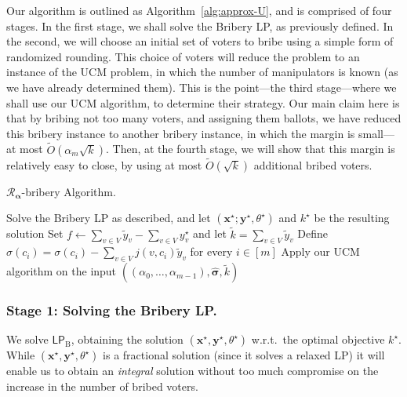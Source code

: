 \documentclass[letterpaper]{article} %
\theoremstyle{definition}
\newcommand\vecc{\mathbf}
\newcommand\vecgreek{\bm}
\newcommand{\veca}{\vecgreek{\alpha}}
\newcommand{\Ra}{\mathcal{R}_{\veca}}
\newcommand{\LPB}{\mathsf{LP}_{\mathrm{B}}}
\begin{document}
Our algorithm is outlined as Algorithm~\ref{alg:approx-U}, and is comprised of four stages. In the first stage, we shall solve the Bribery LP, as previously defined. In the second, we will choose an initial set of voters to bribe using a simple form of randomized rounding.
This choice of voters will reduce the problem to an instance of the UCM problem, in which the number of manipulators is known (as we have already determined them). This is the point---the third stage---where we shall use our UCM algorithm, to determine their strategy. Our main claim here is that by bribing not too many voters, and assigning them ballots, we have reduced this bribery instance to another bribery instance, in which the margin is small---at most $\widetilde{O}(\alpha_{m}\sqrt{k})$. Then, at the fourth stage, we will show that this margin is relatively easy to close, by using at most $\widetilde{O}(\sqrt{k})$ additional bribed voters.
\begin{algorithm}[t]
	\caption{$\Ra$-bribery Algorithm.}
	\label{alg:approx-U}
	Solve the Bribery LP as described, and let $(\vecc{x^\star };\vecc{y^\star },\theta^\star )$ and $k^\star$ be the resulting solution\;
	Set $f \gets \sum_{v \in V}\tilde{y}_v - \sum_{v \in V} y^\star _v$ and let $\tilde{k}=\sum_{v \in V} \tilde{y}_v$\;
	Define  $\hat{\sigma}(c_i)= \sigma(c_i) - \sum_{v \in V}j(v,c_i) \tilde{y}_{v}$ for every $i \in [m]$\;
	Apply our UCM algorithm on the input $((\alpha_{0},\ldots,\alpha_{m-1}),\vecgreek{\hat{\sigma}}, \tilde{k})$ \;
\end{algorithm}


\subsubsection{Stage 1: Solving the Bribery LP.}
We solve $\LPB$, obtaining the solution $(\vecc{x^\star },\vecc{y^\star },\theta^\star )$ w.r.t.\ the optimal objective $k^\star $. While $(\vecc{x^\star },\vecc{y^\star },\theta^\star )$ is a fractional solution (since it solves a relaxed LP) it will enable us to obtain an \emph{integral} solution without too much compromise on the increase in the number of bribed voters.
\end{document}
